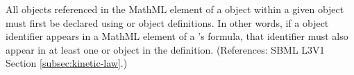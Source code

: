 All \Species objects referenced in the MathML  element of a
\KineticLaw object within a given \Reaction object must first be declared
using \SpeciesReference or \ModifierSpeciesReference object definitions.
In other words, if a \Species object identifier appears in a MathML
 element of a \Reaction's \KineticLaw formula, that identifier
must also appear in at least one \SpeciesReference or \ModifierSpeciesReference
object in the \Reaction definition.  (References: SBML L3V1 
Section \ref{subsec:kinetic-law}.)
